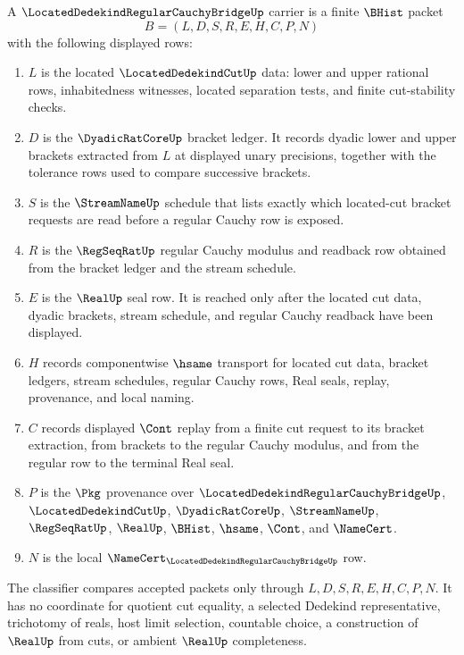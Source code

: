 \begin{definition}
\label{def:located-dedekind-regular-cauchy-bridge-carrier}
A $\LocatedDedekindRegularCauchyBridgeUp$ carrier is a finite $\BHist$ packet
$$
B=(L,D,S,R,E,H,C,P,N)
$$
with the following displayed rows:
\begin{enumerate}
\item $L$ is the located $\LocatedDedekindCutUp$ data: lower and upper rational rows, inhabitedness witnesses, located separation tests, and finite cut-stability checks.
\item $D$ is the $\DyadicRatCoreUp$ bracket ledger. It records dyadic lower and upper brackets extracted from $L$ at displayed unary precisions, together with the tolerance rows used to compare successive brackets.
\item $S$ is the $\StreamNameUp$ schedule that lists exactly which located-cut bracket requests are read before a regular Cauchy row is exposed.
\item $R$ is the $\RegSeqRatUp$ regular Cauchy modulus and readback row obtained from the bracket ledger and the stream schedule.
\item $E$ is the $\RealUp$ seal row. It is reached only after the located cut data, dyadic brackets, stream schedule, and regular Cauchy readback have been displayed.
\item $H$ records componentwise $\hsame$ transport for located cut data, bracket ledgers, stream schedules, regular Cauchy rows, Real seals, replay, provenance, and local naming.
\item $C$ records displayed $\Cont$ replay from a finite cut request to its bracket extraction, from brackets to the regular Cauchy modulus, and from the regular row to the terminal Real seal.
\item $P$ is the $\Pkg$ provenance over $\LocatedDedekindRegularCauchyBridgeUp$, $\LocatedDedekindCutUp$, $\DyadicRatCoreUp$, $\StreamNameUp$, $\RegSeqRatUp$, $\RealUp$, $\BHist$, $\hsame$, $\Cont$, and $\NameCert$.
\item $N$ is the local $\NameCert_{\LocatedDedekindRegularCauchyBridgeUp}$ row.
\end{enumerate}
The classifier compares accepted packets only through $L,D,S,R,E,H,C,P,N$. It has no coordinate for quotient cut equality, a selected Dedekind representative, trichotomy of reals, host limit selection, countable choice, a construction of $\RealUp$ from cuts, or ambient $\RealUp$ completeness.
\end{definition}

